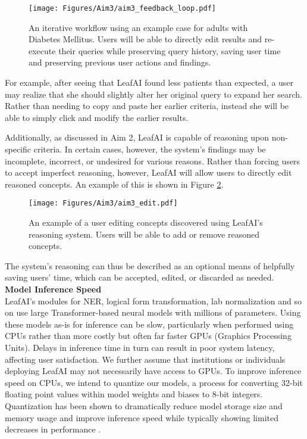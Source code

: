 \documentclass[../main.tex]{subfiles}
\begin{document}
\begin{figure}[h!]
  \centering
  \texttt{[image: Figures/Aim3/aim3\_feedback\_loop.pdf]}  
  \caption{An iterative workflow using an example case for adults with Diabetes Mellitus. Users will be able to directly edit results and re-execute their queries while preserving query history, saving user time and preserving previous user actions and findings.}
\label{aim3_fig_feedback_loop}
\end{figure}

For example, after seeing that LeafAI found less patients than expected, a user may realize that she should slightly alter her original query to expand her search. Rather than needing to copy and paste her earlier criteria, instead she will be able to simply click and modify the earlier results.

Additionally, as discussed in Aim 2, LeafAI is capable of reasoning upon non-specific criteria. In certain cases, however, the system's findings may be incomplete, incorrect, or undesired for various reasons. Rather than forcing users to accept imperfect reasoning, however, LeafAI will allow users to directly edit reasoned concepts. An example of this is shown in Figure \ref{aim3_fig_edit}.

\begin{figure}[h!]
  \centering
  \texttt{[image: Figures/Aim3/aim3\_edit.pdf]}  
  \caption{An example of a user editing concepts discovered using LeafAI's reasoning system. Users will be able to add or remove reasoned concepts.}
\label{aim3_fig_edit}
\end{figure}

The system's reasoning can thus be described as an optional means of helpfully saving users' time, which can be accepted, edited, or discarded as needed. \\

\noindent \textbf{Model Inference Speed} \\
LeafAI's modules for NER, logical form transformation, lab normalization and so on use large Transformer-based neural models \cite{vaswani2017attention} with millions of parameters. Using these models as-is for inference can be slow, particularly when performed using CPUs rather than more costly but often far faster GPUs (Graphics Processing Units). Delays in inference time in turn can result in poor system latency, affecting user satisfaction. We further assume that institutions or individuals deploying LeafAI may not necessarily have access to GPUs. To improve inference speed on CPUs, we intend to quantize our models, a process for converting 32-bit floating point values within model weights and biases to 8-bit integers. Quantization has been shown to dramatically reduce model storage size and memory usage and improve inference speed while typically showing limited decreases in performance \cite{hubara2017quantized}. 
\end{document}
